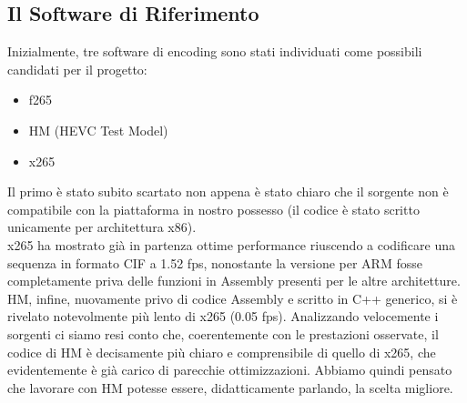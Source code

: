\subsection{Il Software di Riferimento}
Inizialmente, tre software di encoding sono stati individuati come possibili
candidati per il progetto:
\begin{itemize}
	\item f265
	\item HM (HEVC Test Model)
	\item x265
\end{itemize}
Il primo è stato subito scartato non appena è stato chiaro che il sorgente non 
è compatibile con la piattaforma in nostro possesso (il codice è stato scritto 
unicamente per architettura x86).\\
x265 ha mostrato già in partenza ottime performance riuscendo a 
codificare una sequenza in formato CIF a 1.52 fps, nonostante la versione per 
ARM fosse completamente priva delle funzioni in Assembly presenti per le altre 
architetture.\\
HM, infine, nuovamente privo di codice Assembly e scritto in C++ generico, si è 
rivelato notevolmente più lento di x265 (0.05 fps). Analizzando velocemente i 
sorgenti 
ci siamo resi conto che, coerentemente con le prestazioni osservate, il codice 
di HM è decisamente più chiaro e comprensibile di quello di x265, che 
evidentemente è già carico di parecchie ottimizzazioni. Abbiamo quindi pensato 
che 
lavorare con HM potesse essere, didatticamente parlando, la scelta migliore.
